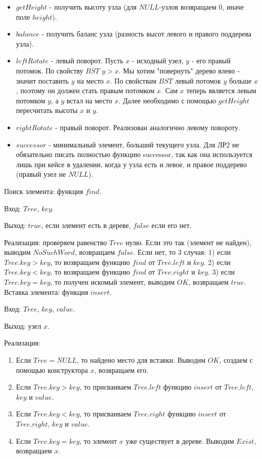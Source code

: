 \documentclass[12pt]{article}
\begin{document}
	\begin{itemize}
		\item $getHeight$ - получить высоту узла (для $NULL$-узлов возвращаем 0, иначе поле $height$).
		\item $balance$ - получить баланс узла (разность высот левого и правого поддерева узла).
		\item $leftRotate$ - левый поворот. Пусть $x$ - исходный узел, $y$ - его правый потомок. По свойству $BST$ $y > x$. Мы хотим "повернуть" дерево влево - значит поставить $y$ на место $x$. По свойствам $BST$ левый потомок $y$ больше $x$, поэтому он должен стать правым потомком $x$. Сам $x$ теперь является левым потомком $y$, а $y$ встал на место $x$. Далее необходимо с помощью $getHeight$ пересчитать высоты $x$ и $y$.
		\item $rightRotate$ - правый поворот. Реализован аналогично левому повороту.
		\item $successor$ - минимальный элемент, больший текущего узла. Для ЛР2 не обязательно писать полностью функцию successor, так как она используется лишь при кейсе в удалении, когда у узла есть и левое, и правое поддерево (правый узел не $NULL$).
	\end{itemize}
	
	Поиск элемента: функция $find$.

	Вход: $Tree$, $key$.
	
	Выход: $true$, если элемент есть в дереве, $false$ если его нет.
	
	Реализация: проверяем равенство $Tree$ нулю. Если это так (элемент не найден), выводим $NoSuchWord$, возвращаем $false$. Если нет, то 3 случая: 1) если $Tree.key > key$, то возвращаем функцию $find$ от $Tree.left$ и $key$. 2) если $Tree.key < key$, то возвращаем функцию $find$ от $Tree.right$ и $key$. 3) если $Tree.key = key$, то получен искомый элемент, выводим $OK$, возвращаем $true$. \\[1mm]
	
	Вставка элемента: функция $insert$.
	
	Вход: $Tree$, $key$, $value$.
	
	Выход: узел $x$.
	
	Реализация: 
	
	\begin{enumerate}
		\item Если $Tree = NULL$, то найдено место для вставки. Выводим $OK$, создаем с помощью конструктора $x$, возвращаем его.
		\item Если $Tree.key > key$, то присваиваем $Tree.left$ функцию $insert$ от $Tree.left$, $key$ и $value$.
		\item Если $Tree.key < key$, то присваиваем $Tree.right$ функцию $insert$ от $Tree.right$, $key$ и $value$.
		\item Если $Tree.key = key$, то элемент $x$ уже существует в дереве. Выводим $Exist$, возвращаем $x$.
	\end{enumerate}
\end{document}
